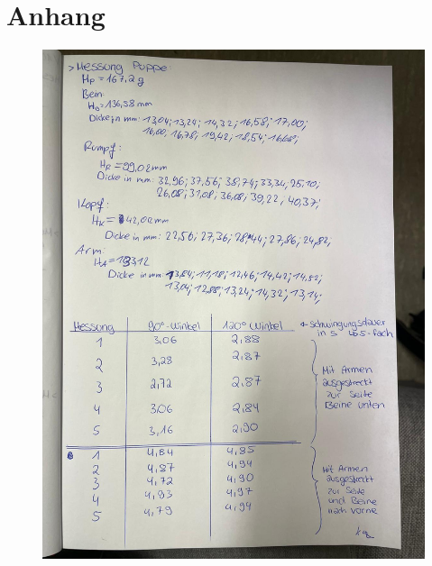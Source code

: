 \newpage
\section*{Anhang}
\label{sec:Anhang}
\newpage
\begin{figure}
    \centering
    \includegraphics[width=\textwidth]{messdaten_bilder/Daten1.jpg}
\end{figure}
